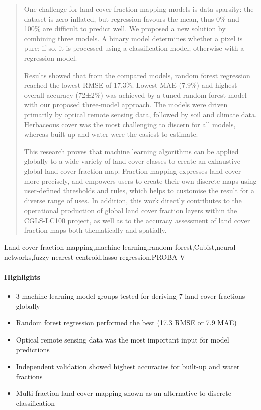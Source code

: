 \documentclass[review,authoryear,3p]{elsarticle}
\newcommand{\minisection}[1]{\paragraph{#1}}%
\begin{document}
\begin{frontmatter}
\begin{abstract}
One challenge for land cover fraction mapping models is data sparsity: the dataset is zero-inflated, but regression favours the mean, thus 0\% and 100\% are difficult to predict well. We proposed a new solution by combining three models. A binary model determines whether a pixel is pure; if so, it is processed using a classification model; otherwise with a regression model.

Results showed that from the compared models, random forest regression reached the lowest RMSE of 17.3\%. Lowest MAE (7.9\%) and highest overall accuracy (72±2\%) was achieved by a tuned random forest model with our proposed three-model approach. The models were driven primarily by optical remote sensing data, followed by soil and climate data. Herbaceous cover was the most challenging to discern for all models, whereas built-up and water were the easiest to estimate.

This research proves that machine learning algorithms can be applied globally to a wide variety of land cover classes to create an exhaustive global land cover fraction map. Fraction mapping expresses land cover more precisely, and empowers users to create their own discrete maps using user-defined thresholds and rules, which helps to customise the result for a diverse range of uses. In addition, this work directly contributes to the operational production of global land cover fraction layers within the \gls{CGLS-LC100} project, as well as to the accuracy assessment of land cover fraction maps both thematically and spatially.
\end{abstract}

\begin{keyword}
Land cover fraction mapping\sep machine learning\sep random forest\sep Cubist\sep neural networks\sep fuzzy nearest centroid\sep lasso regression\sep PROBA-V
\end{keyword}

\end{frontmatter} %


\linenumbers

\minisection{Highlights}

\begin{itemize}
    \item 3 machine learning model groups tested for deriving 7 land cover fractions globally
    \item Random forest regression performed the best (17.3 RMSE or 7.9 MAE)
    \item Optical remote sensing data was the most important input for model predictions
    \item Independent validation showed highest accuracies for built-up and water fractions
    \item Multi-fraction land cover mapping shown as an alternative to discrete classification
\end{itemize}
\end{document}
